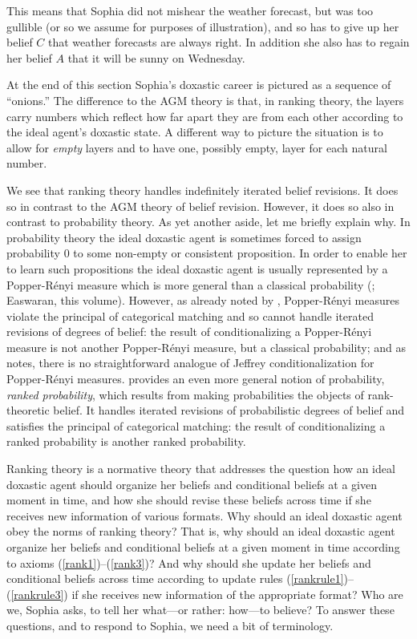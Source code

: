 This means that Sophia did not mishear the weather forecast, but was too gullible (or so we assume for purposes of illustration), and so has to give up her belief $C$ that weather forecasts are always right. In addition she also has to regain her belief $A$ that it will be sunny on Wednesday.

At the end of this section Sophia's doxastic career is pictured as a sequence of ``onions.'' The difference to the AGM theory is that, in ranking theory, the layers carry numbers which reflect how far apart they are from each other according to the ideal agent's doxastic state. A different way to picture the situation is to allow for \emph{empty} layers and to have one, possibly empty, layer for each natural number.

We see that ranking theory handles indefinitely iterated belief revisions. It does so in contrast to the AGM theory of belief revision. However, it does so also in contrast to probability theory. As yet another aside, let me briefly explain why. In probability theory the ideal doxastic agent is sometimes forced to assign probability $0$ to some non-empty or consistent proposition. In order to enable her to learn such propositions the ideal doxastic agent is usually represented by a Popper-R\'{e}nyi measure which is more general than a classical probability (\citealp{p55, r55, s70, s86}; Easwaran, this volume). However, as already noted by \citet{h76a}, Popper-R\'{e}nyi measures violate the principal of categorical matching and so cannot handle iterated revisions of degrees of belief: the result of conditionalizing a Popper-R\'{e}nyi measure is not another Popper-R\'{e}nyi measure, but a classical probability; and as \citet{b95} notes, there is no straightforward analogue of Jeffrey conditionalization for Popper-R\'{e}nyi measures. \citet{s06a} provides an even more general notion of probability, \emph{ranked probability}, which results from making probabilities the objects of rank-theoretic belief. It handles iterated revisions of probabilistic degrees of belief and satisfies the principal of categorical matching: the result of conditionalizing a ranked probability is another ranked probability.

Ranking theory is a normative theory that addresses the question how an ideal doxastic agent should organize her beliefs and conditional beliefs at a given moment in time, and how she should revise these beliefs across time if she receives new information of various formats. Why should an ideal doxastic agent obey the norms of ranking theory? That is, why should an ideal doxastic agent organize her beliefs and conditional beliefs at a given moment in time according to axioms (\ref{rank1})--(\ref{rank3})? And why should she update her beliefs and conditional beliefs across time according to update rules (\ref{rankrule1})--(\ref{rankrule3}) if she receives new information of the appropriate format? Who are we, Sophia asks, to tell her what---or rather: how---to believe? To answer these questions, and to respond to Sophia, we need a bit of terminology.

